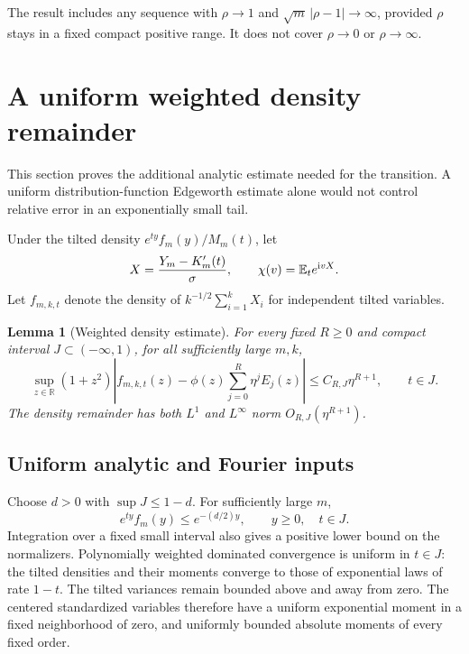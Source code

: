 \documentclass[11pt]{article}
\numberwithin{equation}{section}
\newtheorem{lemma}[theorem]{Lemma}
\theoremstyle{remark}\newtheorem{remark}[theorem]{Remark}
\newcommand{\ii}{\mathrm i}\newcommand{\sgn}{\operatorname{sgn}}
\begin{document}
The result includes any sequence with $\rho\to1$ and
$\sqrt m\,|\rho-1|\to\infty$, provided $\rho$ stays in a fixed compact
positive range.  It does not cover $\rho\to0$ or $\rho\to\infty$.

\section{A uniform weighted density remainder}\label{brs:un:sec:densityproof}

This section proves the additional analytic estimate needed for the
transition.  A uniform distribution-function Edgeworth estimate alone
would not control relative error in an exponentially small tail.

Under the tilted density $e^{ty}f_m(y)/M_m(t)$, let
\[
 X=\frac{Y_m-K'_m(t)}{\sigma},\qquad
 \chi(v)=\E_t e^{\ii vX}.
\]
Let $f_{m,k,t}$ denote the density of
$k^{-1/2}\sum_{i=1}^kX_i$ for independent tilted variables.

\begin{lemma}[Weighted density estimate]\label{brs:un:lem:density}
For every fixed $R\ge0$ and compact interval $J\subset(-\infty,1)$,
for all sufficiently large $m,k$,
\begin{equation}\label{brs:un:eq:D}
 \sup_{z\in\mathbb R}(1+z^2)
 \left|f_{m,k,t}(z)-\phi(z)\sum_{j=0}^R\eta^j E_j(z)\right|
 \le C_{R,J}\eta^{R+1},\qquad t\in J.
\end{equation}
The density remainder has both $L^1$ and $L^\infty$ norm
$O_{R,J}(\eta^{R+1})$.
\end{lemma}

\subsection{Uniform analytic and Fourier inputs}

Choose $d>0$ with $\sup J\le1-d$.  For sufficiently large $m$,
\[
 e^{ty}f_m(y)\le e^{-(d/2)y},\qquad y\ge0,\quad t\in J.
\]
Integration over a fixed small interval also gives a positive lower
bound on the normalizers.  Polynomially weighted dominated convergence
is uniform in $t\in J$: the tilted densities and their moments converge
to those of exponential laws of rate $1-t$.  The tilted variances
remain bounded above and away from zero.  The centered standardized
variables therefore have a uniform exponential moment in a fixed
neighborhood of zero, and uniformly bounded absolute moments of every
fixed order.
\end{document}
